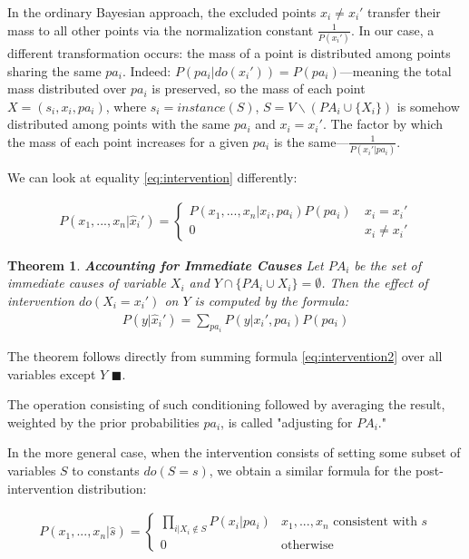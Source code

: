 \documentclass[fleqn]{article}
\newtheorem{theorem}{Theorem}
\numberwithin{equation}{section}
\numberwithin{theorem}{section}
\numberwithin{figure}{section}
\numberwithin{lemma}{section}
\numberwithin{corollary}{section}
\begin{document}
In the ordinary Bayesian approach, the excluded points $x_i \neq x_i'$ transfer their mass to all other points via the normalization constant $\frac{1}{P(x_i')}$. In our case, a different transformation occurs: the mass of a point is distributed among points sharing the same $pa_i$. Indeed: $P(pa_i | do(x_i')) = P(pa_i)$—meaning the total mass distributed over $pa_i$ is preserved, so the mass of each point $X = (s_i, x_i, pa_i)$, where $s_i = instance(S)$, $S = V \backslash (PA_i \cup \{X_i\})$ is somehow distributed among points with the same $pa_i$ and $x_i = x_i'$. The factor by which the mass of each point increases for a given $pa_i$ is the same—$\frac{1}{P(x_i'|pa_i)}$.

We can look at equality \ref{eq:intervention} differently:

\begin{align}
	P(x_1,...,x_n|\hat x_i') = \begin{cases}
		P(x_1,...,x_n| x_i, pa_i)P(pa_i) & \ x_i = x_i'\\
		0 & \ x_i \neq x_i'
	\end{cases}
	\label{eq:intervention2}
\end{align}

\begin{theorem}
	\textbf{Accounting for Immediate Causes} Let $PA_i$ be the set of immediate causes of variable $X_i$ and $Y \cap \{PA_i \cup X_i\} = \emptyset$. Then the effect of intervention $do(X_i = x_i')$ on $Y$ is computed by the formula:
	\begin{align}
		P(y|\hat x_i') = \sum\limits_{pa_i} P(y|x_i', pa_i) P(pa_i)
		\label{eq:adjusting_formula}
	\end{align}
\end{theorem}

The theorem follows directly from summing formula \ref{eq:intervention2} over all variables except $Y$ $\blacksquare$.

The operation consisting of such conditioning followed by averaging the result, weighted by the prior probabilities $pa_i$, is called "adjusting for $PA_i$."

In the more general case, when the intervention consists of setting some subset of variables $S$ to constants $do(S = s)$, we obtain a similar formula for the post-intervention distribution:

\begin{align}
	P(x_1,...,x_n|\hat s) = \begin{cases}
		\prod\limits_{i| X_i \notin S} P(x_i|pa_i) & x_1,...,x_n \text{ consistent with } s\\
		0 & \text{otherwise}
	\end{cases}
	\label{eq:intervention3}
\end{align}
\end{document}
